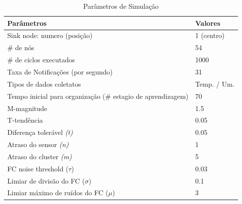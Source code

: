 \documentclass{acm_proc_article-sp}
\begin{document}
\begin{table}[h!]
\tiny 
\caption{Parâmetros de Simulação}
\label{tab:parameters}
\begin{center}
\begin{tabular}{|l||l|}
\hline
Parâmetros &Valores\\
\hline\hline
Sink node: numero (posição) &1 (centro) \\
\hline
\# de nós &54 \\
\hline
\# de ciclos executados &1000 \\
\hline
Taxa de Notificações (por segundo) &31 \\
\hline
Tipos de dados coletatos &Temp. / Um. \\
\hline
Tempo inicial para organização (\# estagio de aprendizagem) &70 \\
\hline
M-magnitude &1.5 \\
\hline
T-tendência &0.05 \\
\hline
Diferença tolerável {\it(t)} &0.05 \\
\hline
Atraso do sensor {\it(n)} &1 \\
\hline
Atraso do cluster {\it(m)} &5 \\
\hline
FC noise threshold ($\tau$) &0.03 \\
\hline
Limiar de divisão do FC ($\sigma$) &0.1 \\
\hline
Limiar máximo de ruídos do FC ($\mu$) &3 \\
\hline
\end{tabular}
\end{center}
\end{table}
\vspace*{-.3cm}
\end{document}
